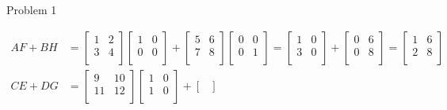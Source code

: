 \begin{problem}{Problem 1}
\begin{highlight}[Solution]
\begin{align*}
            AF + BH & = 
            \begin{bmatrix}
                1 & 2 \\
                3 & 4 \\
            \end{bmatrix}
            \begin{bmatrix}
                1 & 0 \\
                0 & 0 \\
            \end{bmatrix}
            + 
            \begin{bmatrix}
                5 & 6 \\
                7 & 8 \\
            \end{bmatrix}
            \begin{bmatrix}
                0 & 0 \\
                0 & 1 \\
            \end{bmatrix}
            = 
            \begin{bmatrix}
                1 & 0 \\
                3 & 0 \\
            \end{bmatrix}
            + 
            \begin{bmatrix}
                0 & 6 \\
                0 & 8 \\
            \end{bmatrix}
            = 
            \begin{bmatrix}
                1 & 6 \\
                2 & 8 \\
            \end{bmatrix} \\
            CE + DG & = 
            \begin{bmatrix}
                9 & 10 \\
                11 & 12 \\
            \end{bmatrix}
            \begin{bmatrix}
                1 & 0 \\
                1 & 0 \\
            \end{bmatrix}
            + 
            \begin{bmatrix}

\end{bmatrix}
\end{align*}
\end{highlight}
\end{problem}
